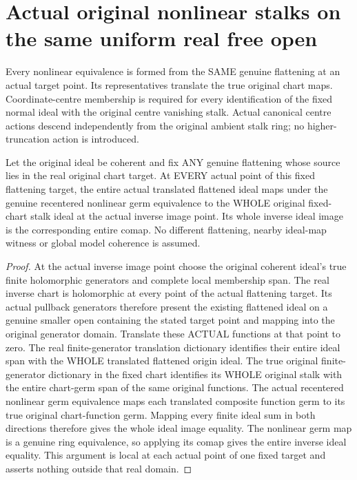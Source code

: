 \section{Actual original nonlinear stalks on the same uniform real free open}

Every nonlinear equivalence is formed from the SAME genuine flattening at
an actual target point. Its representatives translate the true original
chart maps. Coordinate-centre membership is required for every identification
of the fixed normal ideal with the original centre vanishing stalk. Actual
canonical centre actions descend independently from the original ambient
stalk ring; no higher-truncation action is introduced.

\begin{lemma}
\label{hir:real-domain-fixed-flattening-all-original-whole-stalks-whole-parent}
\leanok
Let the original ideal be coherent and fix ANY genuine flattening whose
source lies in the real original chart target. At EVERY actual point of
this fixed flattening target, the entire actual translated flattened ideal
maps under the genuine recentered nonlinear germ equivalence to the WHOLE
original fixed-chart stalk ideal at the actual inverse image point. Its
whole inverse ideal image is the corresponding entire comap. No different
flattening, nearby ideal-map witness or global model coherence is assumed.
\end{lemma}
\begin{proof}
At the actual inverse image point choose the original coherent ideal's true
finite holomorphic generators and complete local membership span. The real
inverse chart is holomorphic at every point of the actual flattening target.
Its actual pullback generators therefore present the existing flattened
ideal on a genuine smaller open containing the stated target point and
mapping into the original generator domain. Translate these ACTUAL functions
at that point to zero. The real finite-generator translation dictionary
identifies their entire ideal span with the WHOLE translated flattened
origin ideal. The true original finite-generator dictionary in the fixed
chart identifies its WHOLE original stalk with the entire chart-germ span
of the same original functions. The actual recentered nonlinear germ
equivalence maps each translated composite function germ to its true
original chart-function germ. Mapping every finite ideal sum in both
directions therefore gives the whole ideal image equality. The nonlinear
germ map is a genuine ring equivalence, so applying its comap gives the
entire inverse ideal equality. This argument is local at each actual point
of one fixed target and asserts nothing outside that real domain.
\end{proof}

